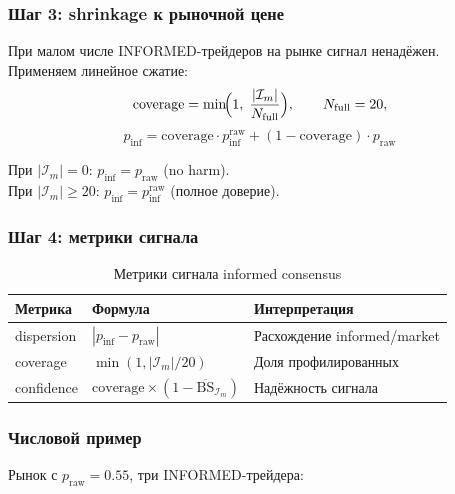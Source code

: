 \documentclass[a4paper, 11pt]{article}
\newcommand{\bs}{\mathrm{BS}}
\begin{document}
\subsubsection{Шаг 3: shrinkage к рыночной цене}
\label{sec:coverage_shrinkage}

При малом числе INFORMED-трейдеров на рынке сигнал ненадёжен.
Применяем линейное сжатие:
\begin{equation}
\label{eq:coverage}
\mathrm{coverage} = \min\!\Bigl(1,\; \frac{|\mathcal{I}_m|}{N_{\mathrm{full}}}\Bigr), \qquad
N_{\mathrm{full}} = 20,
\end{equation}
\begin{equation}
\label{eq:informed_final}
\boxed{
p_{\mathrm{inf}} = \mathrm{coverage} \cdot p_{\mathrm{inf}}^{\mathrm{raw}} + (1 - \mathrm{coverage}) \cdot p_{\mathrm{raw}}
}
\end{equation}

При $|\mathcal{I}_m| = 0$: $p_{\mathrm{inf}} = p_{\mathrm{raw}}$ (no harm).\\
При $|\mathcal{I}_m| \geq 20$: $p_{\mathrm{inf}} = p_{\mathrm{inf}}^{\mathrm{raw}}$ (полное доверие).

\subsubsection{Шаг 4: метрики сигнала}

\begin{table}[h]
\centering
\begin{tabular}{lll}
\toprule
\textbf{Метрика} & \textbf{Формула} & \textbf{Интерпретация} \\
\midrule
dispersion  & $|p_{\mathrm{inf}} - p_{\mathrm{raw}}|$                        & Расхождение informed/market \\
coverage    & $\min(1, |\mathcal{I}_m|/20)$                                   & Доля профилированных \\
confidence  & $\mathrm{coverage} \times (1 - \overline{\bs}_{\mathcal{I}_m})$ & Надёжность сигнала \\
\bottomrule
\end{tabular}
\caption{Метрики сигнала informed consensus}
\label{tab:signal_metrics}
\end{table}

\subsubsection{Числовой пример}

Рынок с $p_{\mathrm{raw}} = 0.55$, три INFORMED-трейдера:
\end{document}
